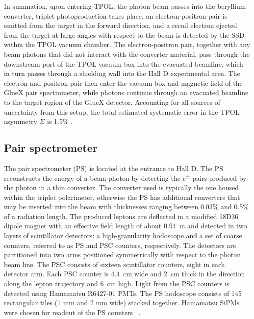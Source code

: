 In summation, upon entering TPOL, the photon beam passes into the
beryllium converter, triplet photoproduction takes place, an
electron-positron pair is emitted from the target in the forward direction,
and a recoil electron ejected from the target at large angles with
respect to the beam is detected by the SSD within the TPOL vacuum chamber.
The electron-positron pair, together with any beam photons that did not
interact with the converter material, pass through the downstream port of
the TPOL vacuum box into the evacuated beamline, which in turn passes
through a shielding wall into the Hall D experimental area. The electron
and positron pair then enter the vacuum box and magnetic field of the GlueX
pair spectrometer, while photons continue through an evacuated beamline to
the target region of the GlueX detector. Accounting for all sources of
uncertainty from this setup, the total estimated systematic error in
the TPOL asymmetry $\Sigma$ is 1.5\% \cite{DUGGER2017115}.

\subsection{Pair spectrometer  \label{sec:ps}}

The pair spectrometer (PS) \cite{BARBOSA2015376} is located at the
entrance to Hall D.%
The PS reconstructs the energy of a beam photon by detecting
the $e^\pm$ pairs produced by the photon in a thin converter.
The converter used is typically the one housed within the triplet
polarimeter, otherwise the PS has additional converters that may
be inserted into the beam with thicknesses ranging between 0.03\%
and 0.5\% of a radiation length.
The produced leptons are deflected in a modified 18D36 dipole magnet
with an effective field length of about 0.94~m and detected in two
layers of scintillator detectors: a high-granularity hodoscope and
a set of coarse counters, referred to as PS and PSC counters, respectively.
The detectors are partitioned into two arms positioned symmetrically
with respect to the photon beam line. The PSC consists of sixteen
scintillator counters, eight in each detector arm. Each PSC counter is
4.4~cm wide and 2~cm thick in the direction along the lepton trajectory
and 6~cm high. Light from the PSC counters is detected using Hamamatsu
R6427-01 PMTs. The PS hodoscope consists of 145 rectangular tiles
(1 mm and 2 mm wide) stacked together. Hamamatsu SiPMs were chosen for
readout of the PS counters
~\cite{Barbosa:2017zzw,Somov:2017kif,Tolstukhin:2014zsa}.

